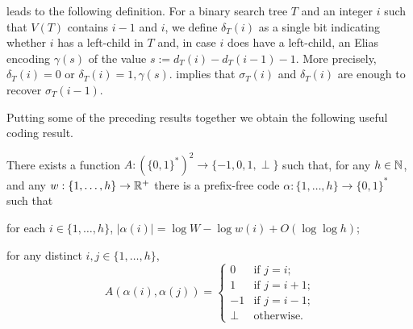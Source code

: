 \documentclass[kpfonts]{patmorin}
\begin{document}
 leads to the following definition. For a binary search tree $T$ and an integer $i$ such that $V(T)$ contains $i-1$ and $i$, we define $\delta_T(i)$ as
a single bit indicating whether $i$ has a left-child in $T$ and, in case $i$ does have a left-child, an Elias encoding $\gamma(s)$ of the value $s:=d_T(i)-d_T(i-1)-1$.  More precisely, $\delta_T(i)=0$ or $\delta_T(i)=1,\gamma(s)$.  implies that $\sigma_T(i)$ and $\delta_T(i)$ are enough to recover $\sigma_T(i-1)$.

\smallskip

Putting some of the preceding results together we obtain the following useful coding result.

\begin{lem}
  There exists a function $A:(\{0,1\}^*)^2\to\{-1,0,1,\perp\}$ such that, for any $h\in\mathbb{N}$, and any $w:\{1,\ldots,h\}\to\mathbb{R}^+$ there is a prefix-free code $\alpha:\{1,\ldots,h\}\to \{0,1\}^*$ such that 
  \begin{compactenum}
    \item for each $i\in\{1,\ldots,h\}$, $|\alpha(i)|=\log W -\log w(i) + O(\log\log h)$;
    \item for any distinct $i,j\in\{1,\ldots,h\}$, 
    \[   A(\alpha(i),\alpha(j)) 
    = \begin{cases}
       0 & \text{if $j=i$;}\\
       1 & \text{if $j=i+1$;} \\
       -1 & \text{if $j=i-1$;} \\
       \perp & \text{otherwise.}
      \end{cases}
      \]
    \end{compactenum}
\end{lem}
\end{document}
